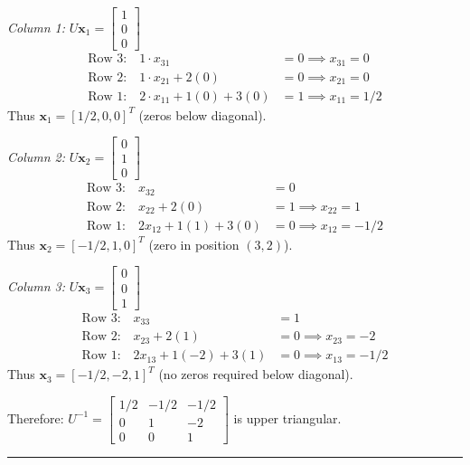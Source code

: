 \textit{Column 1:} $U\mathbf{x}_1 = \begin{bmatrix} 1 \\ 0 \\ 0 \end{bmatrix}$
\begin{align*}
\text{Row 3:} \quad 1 \cdot x_{31} &= 0 \implies x_{31} = 0 \\
\text{Row 2:} \quad 1 \cdot x_{21} + 2(0) &= 0 \implies x_{21} = 0 \\
\text{Row 1:} \quad 2 \cdot x_{11} + 1(0) + 3(0) &= 1 \implies x_{11} = 1/2
\end{align*}
Thus $\mathbf{x}_1 = [1/2, 0, 0]^T$ (zeros below diagonal).

\textit{Column 2:} $U\mathbf{x}_2 = \begin{bmatrix} 0 \\ 1 \\ 0 \end{bmatrix}$
\begin{align*}
\text{Row 3:} \quad x_{32} &= 0 \\
\text{Row 2:} \quad x_{22} + 2(0) &= 1 \implies x_{22} = 1 \\
\text{Row 1:} \quad 2x_{12} + 1(1) + 3(0) &= 0 \implies x_{12} = -1/2
\end{align*}
Thus $\mathbf{x}_2 = [-1/2, 1, 0]^T$ (zero in position $(3,2)$).

\textit{Column 3:} $U\mathbf{x}_3 = \begin{bmatrix} 0 \\ 0 \\ 1 \end{bmatrix}$
\begin{align*}
\text{Row 3:} \quad x_{33} &= 1 \\
\text{Row 2:} \quad x_{23} + 2(1) &= 0 \implies x_{23} = -2 \\
\text{Row 1:} \quad 2x_{13} + 1(-2) + 3(1) &= 0 \implies x_{13} = -1/2
\end{align*}
Thus $\mathbf{x}_3 = [-1/2, -2, 1]^T$ (no zeros required below diagonal).

Therefore: $U^{-1} = \begin{bmatrix} 1/2 & -1/2 & -1/2 \\ 0 & 1 & -2 \\ 0 & 0 & 1 \end{bmatrix}$ is upper triangular.

\vspace{2em}
\noindent\rule{\textwidth}{0.4pt}
